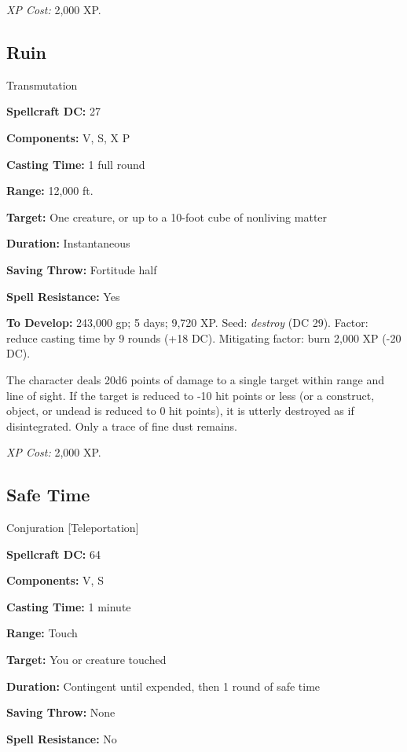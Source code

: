 \documentclass{article}
\begin{document}
\textit{XP Cost: }2,000 XP. 

\vspace{12pt}
\subsection*{Ruin }

Transmutation 

\textbf{Spellcraft DC:} 27 

\textbf{Components:} V, S, X P 

\textbf{Casting Time:} 1 full round 

\textbf{Range:} 12,000 ft. 

\textbf{Target:} One creature, or up to a 10-foot cube of nonliving matter 

\textbf{Duration:} Instantaneous 

\textbf{Saving Throw:} Fortitude half 

\textbf{Spell Resistance:} Yes 

\textbf{To Develop:} 243,000 gp; 5 days; 9,720 XP. Seed: \textit{destroy }(DC 29). 
Factor: reduce casting time by 9 rounds (+18 DC). Mitigating factor: burn 2,000 
XP (-20 DC). 

The character deals 20d6 points of damage to a single target within range and line 
of sight. If the target is reduced to -10 hit points or less (or a construct, object, 
or undead is reduced to 0 hit points), it is utterly destroyed as if disintegrated. 
Only a trace of fine dust remains. 

\textit{XP Cost: }2,000 XP. 

\vspace{12pt}
\subsection*{Safe Time }

Conjuration [Teleportation] 

\textbf{Spellcraft DC:} 64 

\textbf{Components:} V, S 

\textbf{Casting Time:} 1 minute 

\textbf{Range:} Touch 

\textbf{Target:} You or creature touched 

\textbf{Duration:} Contingent until expended, then 1 round of safe time 

\textbf{Saving Throw:} None 

\textbf{Spell Resistance:} No 
\end{document}
